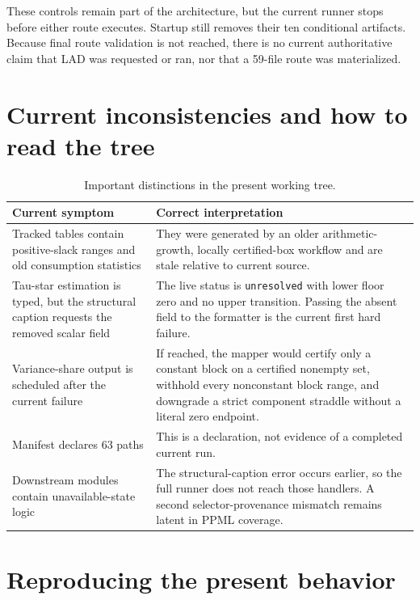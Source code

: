 \documentclass[11pt]{article}
\begin{document}
These controls remain part of the architecture, but the current runner stops
before either route executes. Startup still removes their ten conditional
artifacts. Because final route validation is not reached, there is no current
authoritative claim that LAD was requested or ran, nor that a 59-file route
was materialized.

\section{Current inconsistencies and how to read the tree}

\begin{table}[ht]
\centering
\small
\begin{tabularx}{\textwidth}{@{}p{}X@{}}
\toprule
Current symptom & Correct interpretation \\
\midrule
Tracked tables contain positive-slack ranges and old consumption statistics &
They were generated by an older arithmetic-growth, locally certified-box
workflow and are stale relative to current source. \\
Tau-star estimation is typed, but the structural caption requests the removed
scalar field &
The live status is \texttt{unresolved} with lower floor zero and no upper
transition. Passing the absent field to the formatter is the current first
hard failure. \\
Variance-share output is scheduled after the current failure &
If reached, the mapper would certify only a constant block on a certified
nonempty set, withhold every nonconstant block range, and downgrade a strict
component straddle without a literal zero endpoint. \\
Manifest declares 63 paths &
This is a declaration, not evidence of a completed current run. \\
Downstream modules contain unavailable-state logic &
The structural-caption error occurs earlier, so the full runner does not
reach those handlers. A second selector-provenance mismatch remains latent in
PPML coverage. \\
\bottomrule
\end{tabularx}
\caption{Important distinctions in the present working tree.}
\end{table}

\section{Reproducing the present behavior}
\end{document}
